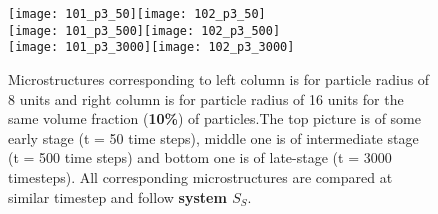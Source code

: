 \documentclass[12pt]{iiscthes}
\theoremstyle{definition}
\theoremstyle{definition}
\theoremstyle{remark}
\begin{document}
 \begin{figure}[H]
\begin{center}
\texttt{[image: 101\_p3\_50]}\texttt{[image: 102\_p3\_50]}\\
\texttt{[image: 101\_p3\_500]}\texttt{[image: 102\_p3\_500]}\\
\texttt{[image: 101\_p3\_3000]}\texttt{[image: 102\_p3\_3000]}\\
\caption{Microstructures corresponding to left column is for particle radius of 8 units and right column is for particle radius of 16 units for the same volume fraction (\textbf{10\%}) of particles.The top picture is of some early stage (t = 50 time steps), middle one is of intermediate stage (t = 500 time steps) and bottom one is of late-stage (t = 3000 timesteps). All corresponding microstructures are compared at similar timestep and follow \textbf{system $S_S$}.}\label{1012_p3}
\end{center}
\end{figure} 

\end{document}
